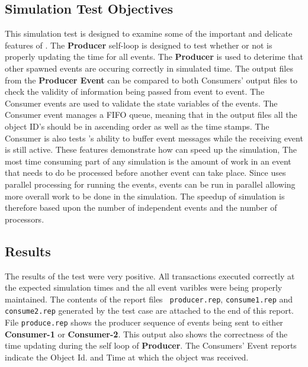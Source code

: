 \subsection{Simulation Test Objectives}
This simulation test is designed to examine some of the important
and delicate features of \dispare.
The {\bf Producer} self-loop is designed to test whether or not
\dispare is properly updating the time for all events.  The {\bf Producer}
is used to deterime that other spawned events are occuring correctly in
simulated time.  The output files from the {\bf Producer Event} can be
compared to both Consumers' output files to check the validity of
information being passed from event to event.  The Consumer events are
used to validate the state variables of the events. The Consumer event
manages a FIFO queue, meaning that in the output files all the object
ID's should be in ascending order as well as the time stamps.  The
Consumer is also tests \dispare's ability to buffer event messages while
the receiving event is still active.  These features demonstrate how
\dispare can speed up the simulation, The most time consuming part of
any simulation is the amount of work in an event that needs to do be
processed before another event can take place.  Since \dispare uses
parallel processing for running the events, events can be run in
parallel allowing more overall work to be done in the simulation.  The
speedup of simulation is therefore based upon the number of independent
events and the number of processors.

 
\subsection{Results}
The results of the test were very positive.  All transactions executed
correctly at the expected simulation times and the all event varibles
were being properly maintained.  The contents of the report files {\tt
producer.rep}, {\tt consume1.rep} and {\tt consume2.rep} generated by
the test case are attached to the end of this report.
File {\tt produce.rep} shows the producer
sequence of events being sent to either {\bf Consumer-1} or {\bf
Consumer-2}.  This output also shows the correctness of the time
updating during the self loop of {\bf Producer}.  The Consumers' Event
reports indicate the Object Id. and Time at which the object was
received.

